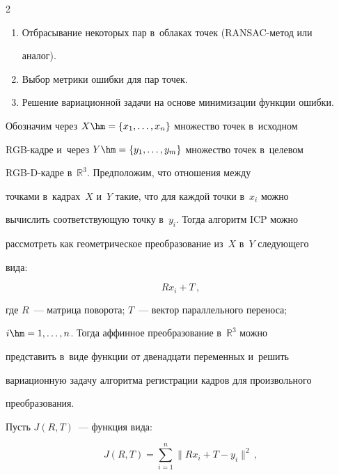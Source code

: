 \begin{multicols}{2}
\begin{enumerate}[1.]
\item Отбрасывание некоторых пар в~облаках точек (RANSAC-ме\-тод или 

аналог).

\item Выбор метрики ошибки для пар точек.

\item Решение вариационной задачи на основе минимизации функции ошибки.

\end{enumerate}

  

  Обозначим через $X\hm=\{x_1, \ldots , x_n\}$ множество точек в~исходном 

RGB-кадре и~через $Y\hm= \{ y_1, \ldots , y_m\}$ множество точек в~целевом 

RGB-D-кад\-ре в~$\mathbb{R}^3$. Предположим, что отношения между 

точками в~кадрах~$X$ и~$Y$ такие, что для каждой точки в~$x_i$ можно 

вычислить со\-от\-вет\-ст\-ву\-ющую точ\-ку в~$y_i$. Тогда алгоритм ICP можно 

рассмотреть как гео\-мет\-ри\-че\-ское преобразование из~$X$ в~$Y$ сле\-ду\-юще\-го 

вида:

  \begin{equation*}

  Rx_i+T\,,


  \end{equation*}

где $R$~--- матрица поворота; $T$~--- вектор параллельного переноса; 

$i\hm=1,\ldots , n$. Тогда аффинное преобра\-зо\-ва\-ние в~$\mathbb{R}^3$ можно 

представить в~виде функции от двенадцати переменных и~решить 

вариационную задачу алгоритма регистрации кад\-ров для произвольного 

преобразования. 



Пусть $J(R,T)$~--- функция вида:

\begin{equation*}

J(R,T)=\sum\limits_{i=1}^n \| R x_i+T-y_i\|^2\,,


\end{equation*}


\end{multicols}
